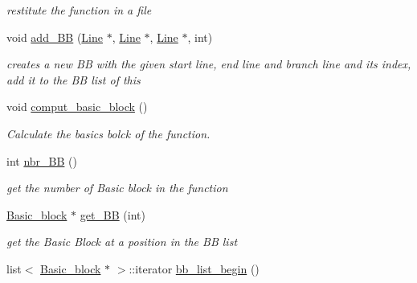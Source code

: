 \begin{DoxyCompactItemize}
\begin{DoxyCompactList}\small\item\em restitute the function in a file \end{DoxyCompactList}\item 
\hypertarget{class_function_a5b1550f534becc9b7ae9fe679fc8db10}{}void \hyperlink{class_function_a5b1550f534becc9b7ae9fe679fc8db10}{add\+\_\+\+B\+B} (\hyperlink{class_line}{Line} $\ast$, \hyperlink{class_line}{Line} $\ast$, \hyperlink{class_line}{Line} $\ast$, int)\label{class_function_a5b1550f534becc9b7ae9fe679fc8db10}

\begin{DoxyCompactList}\small\item\em creates a new B\+B with the given start line, end line and branch line and its index, add it to the B\+B list of this \end{DoxyCompactList}\item 
\hypertarget{class_function_a6094f123294ccbb891fa4145fd5b1b0a}{}void \hyperlink{class_function_a6094f123294ccbb891fa4145fd5b1b0a}{comput\+\_\+basic\+\_\+block} ()\label{class_function_a6094f123294ccbb891fa4145fd5b1b0a}

\begin{DoxyCompactList}\small\item\em Calculate the basics bolck of the function. \end{DoxyCompactList}\item 
\hypertarget{class_function_a4ddde4ac1ff488dfcbfcaee71f727a48}{}int \hyperlink{class_function_a4ddde4ac1ff488dfcbfcaee71f727a48}{nbr\+\_\+\+B\+B} ()\label{class_function_a4ddde4ac1ff488dfcbfcaee71f727a48}

\begin{DoxyCompactList}\small\item\em get the number of Basic block in the function \end{DoxyCompactList}\item 
\hypertarget{class_function_ae11968b8ca5497526e9448b67823d373}{}\hyperlink{class_basic__block}{Basic\+\_\+block} $\ast$ \hyperlink{class_function_ae11968b8ca5497526e9448b67823d373}{get\+\_\+\+B\+B} (int)\label{class_function_ae11968b8ca5497526e9448b67823d373}

\begin{DoxyCompactList}\small\item\em get the Basic Block at a position in the B\+B list \end{DoxyCompactList}\item 
\hypertarget{class_function_a18797dfd75ba34acf0e73b69da8311ec}{}list$<$ \hyperlink{class_basic__block}{Basic\+\_\+block} $\ast$ $>$\+::iterator \hyperlink{class_function_a18797dfd75ba34acf0e73b69da8311ec}{bb\+\_\+list\+\_\+begin} ()\label{class_function_a18797dfd75ba34acf0e73b69da8311ec}


\end{DoxyCompactItemize}
